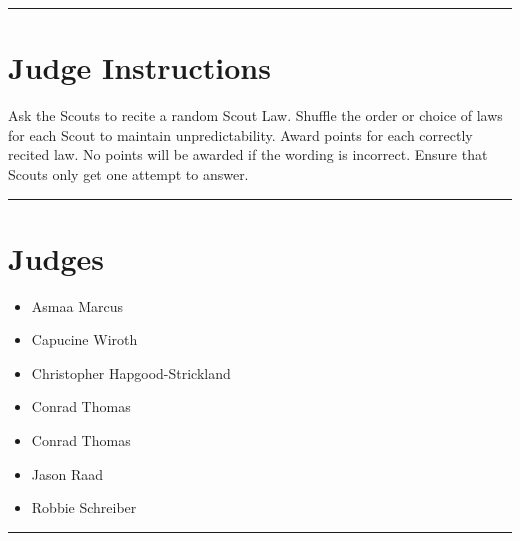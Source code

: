 \documentclass[10pt]{article}
\begin{document}
	\vspace{0.5cm}
	\hrule
	\vspace{0.5cm}

		\section*{Judge Instructions}
		Ask the Scouts to recite a random Scout Law. Shuffle the order or choice of laws for each Scout to maintain unpredictability. Award points for each correctly recited law. No points will be awarded if the wording is incorrect. Ensure that Scouts only get one attempt to answer.


\vspace{0.5cm}
	\hrule
	\vspace{0.5cm}
		\section*{\faUsers \: Judges}

		

	\begin{multicols}{2}

		\begin{itemize}
									\item Asmaa Marcus
									\item Capucine Wiroth
									\item Christopher Hapgood-Strickland
									\item Conrad Thomas
						\end{itemize}

		\vfill\null
		\columnbreak

		\begin{itemize}
									\item Conrad Thomas
									\item Jason Raad
									\item Robbie Schreiber
						\end{itemize}

		\vfill\null

		\end{multicols}



			\vspace{0.5cm}
	\hrule
	\vspace{0.5cm}
\end{document}
